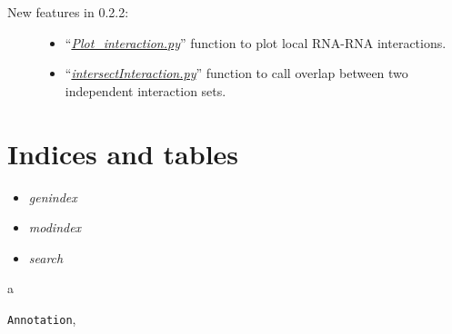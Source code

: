 \documentclass[letterpaper,10pt,english]{sphinxmanual}
\begin{document}
\begin{description}
\begin{itemize}
\end{itemize}

\item[{New features in 0.2.2:}] \leavevmode\begin{itemize}
\item {} 
``{\hyperref[Visualization:plotinteraction]{\emph{Plot\_interaction.py}}}'' function to plot local RNA-RNA interactions.

\item {} 
``{\hyperref[Analysis_pipeline:intersection]{\emph{intersectInteraction.py}}}'' function to call overlap between two independent interaction sets.

\end{itemize}

\end{description}


\chapter{Indices and tables}
\label{index:indices-and-tables}\begin{itemize}
\item {} 
\emph{genindex}

\item {} 
\emph{modindex}

\item {} 
\emph{search}

\end{itemize}


\renewcommand{\indexname}{Python Module Index}
\begin{theindex}
\def\bigletter#1{{\Large\sffamily#1}\nopagebreak\vspace{1mm}}
\bigletter{a}
\item {\texttt{Annotation}}, \pageref{Other_api:module-Annotation}
\end{theindex}

\renewcommand{\indexname}{Index}
\printindex
\end{document}
